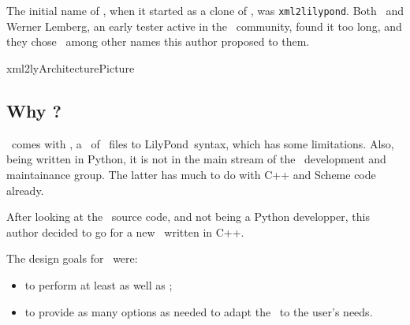 



\chapter{\xmlToLy\ }

The initial name of \xmlToLy, when it started as a clone of \xmlToGuido, was {\tt xml2lilypond}. Both \fober\ and Werner Lemberg, an early tester active in the \lily\ community, found it too long, and they chose \xmlToLy\ among other names this author proposed to them.

{xml2lyArchitecturePicture}


\section{Why \xmlToLy?}

\lily\ comes with \mxmlToLy, a \converter\ of \mxml\ files to LilyPond\ syntax, which has some limitations. Also, being written in Python, it is not in the main stream of the \lily\ development and maintainance group. The latter has much to do with C++ and Scheme code already.

After looking at the \mxmlToLy\ source code, and not being a Python developper, this author decided to go for a new \converter\ written in C++.

The design goals for \xmlToLy\ were:
\begin{itemize}
\item to perform at least as well as \mxmlToLy;
\item to provide as many options as needed to adapt the \lcg\ to the user's needs.
\end{itemize}

